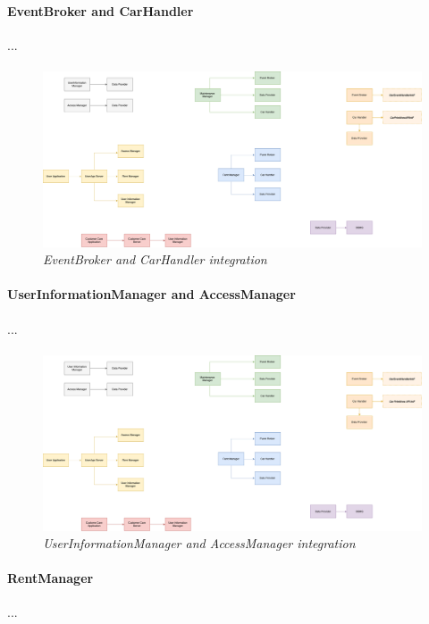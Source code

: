 \paragraph{EventBroker and CarHandler} 
...
\paragraph{}
		
		\begin{figure}[h]
			\centering
			\includegraphics[width=0.6\linewidth]{img/Integration2a}
			\caption{
				\label{fig:eventBrokerCarHandler} 
				\emph{EventBroker and CarHandler integration}
			}
		\end{figure}

\paragraph{UserInformationManager and AccessManager} 
...
\paragraph{}
		
		\begin{figure}[h]
			\centering
			\includegraphics[width=0.6\linewidth]{img/Integration2b}
			\caption{
				\label{fig:userInfoAccessManager} 
				\emph{UserInformationManager and AccessManager integration}
			}
		\end{figure}
		
\paragraph{RentManager} 
...
\paragraph{}
		
